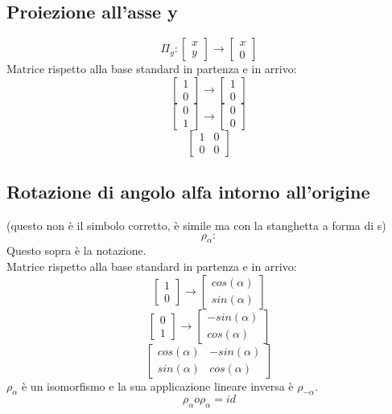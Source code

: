 \documentclass[12pt,a4paper]{article}
\begin{document}
\subsection{Proiezione all'asse y}
\[\Pi_y: 
\begin{bmatrix}
  x\\
  y
\end{bmatrix} \to \begin{bmatrix}
  x\\
  0
\end{bmatrix}
\]
Matrice rispetto alla base standard in partenza e in arrivo:
\[
\begin{bmatrix}
  1\\
  0
\end{bmatrix} \to \begin{bmatrix}
  1\\
  0
\end{bmatrix}
\]
\[
\begin{bmatrix}
  0\\
  1
\end{bmatrix} \to \begin{bmatrix}
  0\\
  0
\end{bmatrix}
\]
\[
\begin{bmatrix}
  1 & 0\\
  0 & 0 
\end{bmatrix}
\]

\subsection{Rotazione di angolo alfa intorno all'origine}
(questo non è il simbolo corretto, è simile ma con la stanghetta a forma di s)
\[\rho_{\alpha}:\]
Questo sopra è la notazione.\\
Matrice rispetto alla base standard in partenza e in arrivo:
\[
\begin{bmatrix}
  1\\
  0
\end{bmatrix} \to \begin{bmatrix}
  cos(\alpha)\\
  sin(\alpha)
\end{bmatrix}
\]
\[
\begin{bmatrix}
  0\\
  1
\end{bmatrix} \to \begin{bmatrix}
  -sin(\alpha)\\
  cos(\alpha)
\end{bmatrix}
\]
\[
\begin{bmatrix}
  cos(\alpha) & -sin(\alpha)\\
  sin(\alpha) & cos(\alpha) 
\end{bmatrix}
\]
$\rho_{\alpha}$ è un isomorfismo e la sua applicazione lineare inversa è $\rho_{-\alpha}$.
\[
\rho_{\alpha} o \rho_{\alpha} = id
\]
\end{document}
